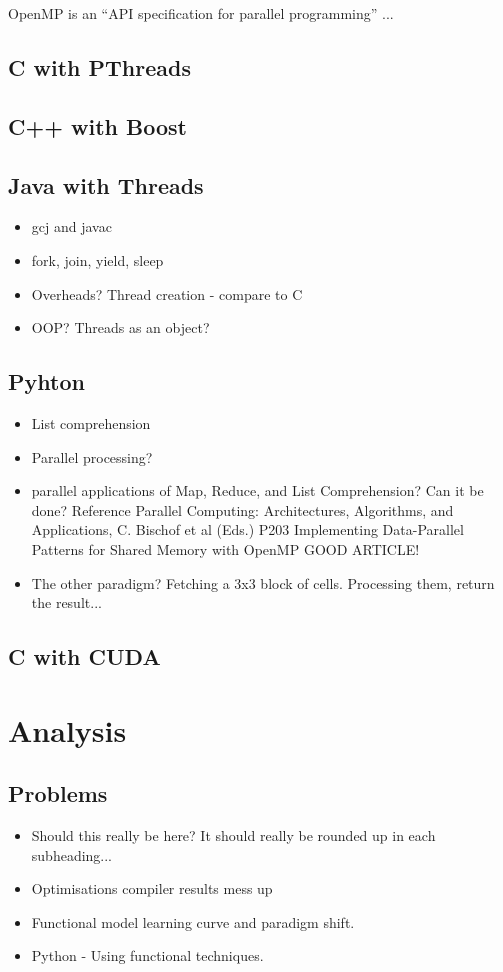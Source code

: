 \documentclass[11pt]{article} %
\begin{document}
OpenMP is an ``API specification for parallel programming'' ... \cite{ref3}

\subsection{C with PThreads}
\subsection{C++ with Boost}
\subsection{Java with Threads}
\begin{itemize}
\item gcj and javac
\item fork, join, yield, sleep
\item Overheads? Thread creation - compare to C
\item OOP? Threads as an object?
\end{itemize}
\subsection{Pyhton}
\begin{itemize}
\item List comprehension
\item Parallel processing?
\item parallel applications of Map, Reduce, and List Comprehension? Can it be done? Reference Parallel Computing: Architectures, Algorithms, and Applications, C. Bischof et al (Eds.) P203 Implementing Data-Parallel Patterns for Shared Memory with OpenMP GOOD ARTICLE!
\item The other paradigm? Fetching a 3x3 block of cells. Processing them, return the result... 
\end{itemize}
\subsection{C with CUDA}
\section{Analysis}
\subsection{Problems}
\begin{itemize}
\item Should this really be here? It should really be rounded up in each subheading...
\item Optimisations compiler results mess up
\item Functional model learning curve and paradigm shift. 
\item Python - Using functional techniques.
\end{itemize}
\end{document}
